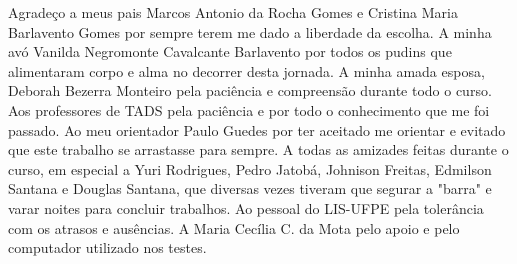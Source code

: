 Agradeço a meus pais Marcos Antonio da Rocha Gomes e Cristina Maria Barlavento Gomes por sempre terem me dado a liberdade da escolha. A minha avó Vanilda Negromonte Cavalcante Barlavento por todos os pudins que alimentaram corpo e alma no decorrer desta jornada. A minha amada esposa, Deborah Bezerra Monteiro pela paciência e compreensão durante todo o curso. Aos professores de TADS pela paciência e por todo o conhecimento que me foi passado. Ao meu orientador Paulo Guedes por ter aceitado me orientar e evitado que este trabalho se arrastasse para sempre. A todas as amizades feitas durante o curso, em especial a Yuri Rodrigues, Pedro Jatobá, Johnison Freitas, Edmilson Santana e Douglas Santana, que diversas vezes tiveram que segurar a "barra" e varar noites para concluir trabalhos. Ao pessoal do LIS-UFPE pela tolerância com os atrasos e ausências. A Maria Cecília C. da Mota pelo apoio e pelo computador utilizado nos testes.